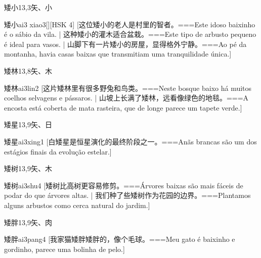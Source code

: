 \begin{Entry}{矮小}{13,3}{⽮、⼩}
  \begin{Phonetics}{矮小}{ai3 xiao3}[][HSK 4]
    [这位矮小的老人是村里的智者。===Este idoso baixinho é o sábio da vila. | 这种矮小的灌木适合盆栽。===Este tipo de arbusto pequeno é ideal para vasos. | 山脚下有一片矮小的房屋，显得格外宁静。===Ao pé da montanha, havia casas baixas que transmitiam uma tranquilidade única.]
  \end{Phonetics}
\end{Entry}

\begin{Entry}{矮林}{13,8}{⽮、⽊}
  \begin{Phonetics}{矮林}{ai3lin2}
    [这片矮林里有很多野兔和鸟类。===Neste bosque baixo há muitos coelhos selvagens e pássaros. | 山坡上长满了矮林，远看像绿色的地毯。===A encosta está coberta de mata rasteira, que de longe parece um tapete verde.]
  \end{Phonetics}
\end{Entry}

\begin{Entry}{矮星}{13,9}{⽮、⽇}
  \begin{Phonetics}{矮星}{ai3xing1}
    [白矮星是恒星演化的最终阶段之一。===Anãs brancas são um dos estágios finais da evolução estelar.]
  \end{Phonetics}
\end{Entry}

\begin{Entry}{矮树}{13,9}{⽮、⽊}
  \begin{Phonetics}{矮树}{ai3shu4}
    [矮树比高树更容易修剪。===Árvores baixas são mais fáceis de podar do que árvores altas. | 我们种了些矮树作为花园的边界。===Plantamos alguns arbustos como cerca natural do jardim.]
  \end{Phonetics}
\end{Entry}

\begin{Entry}{矮胖}{13,9}{⽮、⾁}
  \begin{Phonetics}{矮胖}{ai3pang4}
    [我家猫矮胖矮胖的，像个毛球。===Meu gato é baixinho e gordinho, parece uma bolinha de pelo.]
  \end{Phonetics}
\end{Entry}

